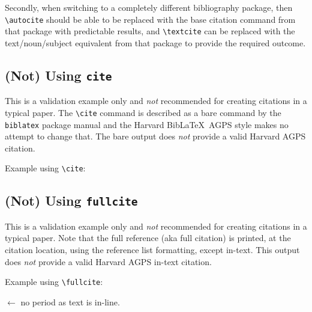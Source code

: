 \documentclass[a4paper, 11pt]{article}
\newcommand*{\BibLaTeX}{Bib\LaTeX}
\newcommand*{\subsectionRefSection}[1]{
    \subsection{#1}
    \refsection
}
\newcommand*{\printsubbibliographyEndRefSection}{
    \printbibliography[heading=subbibliography, title=Reference]
    \endrefsection
}
\newenvironment{agpsExample}{
    \setlength{\parindent}{0pt}
    \medskip
}
{}
\newenvironment{bareList}{%
    \begin{list}{}{}%
}
{\end{list}}
\begin{document}
Secondly, when switching to a completely different bibliography package, then \verb|\autocite|
should be able to be replaced with the base citation command from that package with predictable
results, and \verb|\textcite| can be replaced with the text/noun/subject equivalent from that
package to provide the required outcome.

\subsection{(Not) Using \texttt{cite}}

This is a validation example only and \emph{not} recommended for creating citations in a typical
paper. The \verb|\cite| command is described as a bare command by the \texttt{biblatex} package
manual \autocite[110]{LehmanEtAl2012biblatPackag} and the Harvard \BibLaTeX\ AGPS style makes no
attempt to change that. The bare output does \emph{not} provide a valid Harvard AGPS citation.


\begin{agpsExample}

    Example using \verb|\cite|:

    \begin{bareList}
        \item \cite{Smith1985MicroePolicyFramew}
    \end{bareList}

\end{agpsExample}

\printsubbibliographyEndRefSection

\subsectionRefSection{(Not) Using \texttt{fullcite}}

This is a validation example only and \emph{not} recommended for creating citations in a typical
paper. Note that the full reference (aka full citation) is printed, at the citation location, using
the reference list formatting, except in-text. This output does \emph{not} provide a valid Harvard
AGPS in-text citation.

\begin{agpsExample}

    Example using \verb|\fullcite|:

    \begin{bareList}
        \item {} $\leftarrow$ no period as text is in-line.
    \end{bareList}

\end{agpsExample}
\end{document}

